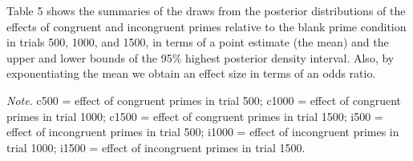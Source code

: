 \documentclass[
  man,floatsintext]{apa6}
\begin{document}
Table 5 shows the summaries of the draws from the posterior distributions of the effects of congruent and incongruent primes relative to the blank prime condition in trials 500, 1000, and 1500, in terms of a point estimate (the mean) and the upper and lower bounds of the 95\% highest posterior density interval. Also, by exponentiating the mean we obtain an effect size in terms of an odds ratio.





\begin{center}
\begin{ThreePartTable}

\begin{TableNotes}[para]
\normalsize{\textit{Note.} c500 = effect of congruent primes in trial 500; c1000 = effect of congruent primes in trial 1000; c1500 = effect of congruent primes in trial 1500; i500 = effect of incongruent primes in trial 500; i1000 = effect of incongruent primes in trial 1000; i1500 = effect of incongruent primes in trial 1500.}
\end{TableNotes}

\scriptsize{

}
\end{ThreePartTable}
\end{center}
\end{document}
